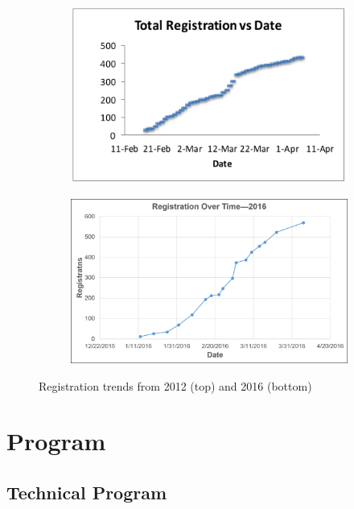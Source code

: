\documentclass[12pt]{article}
\begin{document}
\begin{figure}[h!]
    \centering
    \begin{subfigure}[b]{0.75\textwidth}
        \includegraphics[width=\textwidth]{Reg2012.PNG}
    \end{subfigure}

    \begin{subfigure}[b]{0.75\textwidth}
        \includegraphics[width=\textwidth]{Reg2016.png}
    \end{subfigure}

    \caption{Registration trends from 2012 (top) and 2016 (bottom)}
    \label{fig:Reg}
\end{figure}



\clearpage
\section{Program}

\subsection{Technical Program}
\end{document}
